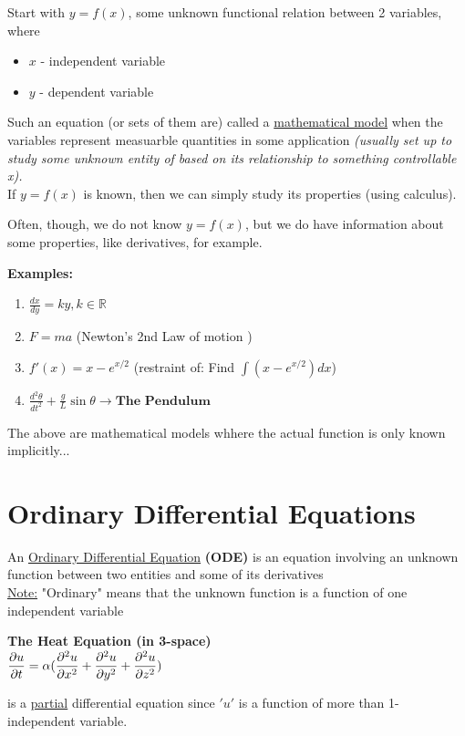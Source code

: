 
Start with $y = f(x)$, some unknown functional relation between 2 variables, where
\begin{itemize}
	\item $x$ - independent variable
	\item $y$ - dependent variable
\end{itemize}

Such an equation (or sets of them are) called a \underline{mathematical model} when the variables represent measuarble quantities in some application \textit{(usually set up to study some unknown entity of based on its relationship to something controllable x).}\\
If $y = f(x)$ is known, then we can simply study its properties (using calculus).

Often, though, we do not know $y = f(x)$, but we do have information about some properties, like derivatives, for example.

\textbf{Examples:}
\begin{enumerate}[label=\protect\circled{\arabic*}]
	\item $\frac{dx}{dy} = ky, k \in \mathbb{R}$
	\item $F = ma$ (Newton's 2nd Law of motion )
	\item $f'(x) = x - e^{x/2}$ (restraint of: Find $\int (x - e^{x/2}) d\textit{x}$)
	\item $\frac{d^2\theta}{dt^{2}} + \frac{g}{L} \sin \theta \rightarrow \textbf{The Pendulum}$
\end{enumerate}

The above are mathematical models whhere the actual function is only known implicitly...

\section*{Ordinary Differential Equations}

\begin{definition-N}
	An \underline{Ordinary Differential Equation} \textbf{(ODE)} is an equation involving an unknown function between two entities and some of its derivatives\\
\underline{Note:} "Ordinary" means that the unknown function is a function of one independent variable
\end{definition-N}

\begin{example-N}
	\textbf{The Heat Equation (in 3-space)}\\
	\center
	$\dfrac{\partial u}{\partial t} = \alpha(\dfrac{\partial^2u}{\partial x^2} + \dfrac{\partial^2 u}{\partial y^2} + \dfrac{\partial^2 u}{\partial z^2})$
	
	is a \underline{partial} differential equation since $'u'$ is a function of more than 1-independent variable.
\end{example-N}

